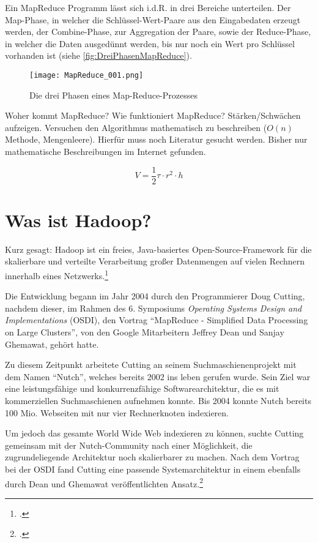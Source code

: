 Ein MapReduce Programm lässt sich i.d.R. in drei Bereiche unterteilen. Der Map-Phase, in welcher die Schlüssel-Wert-Paare aus den Eingabedaten erzeugt werden, der Combine-Phase, zur Aggregation der Paare, sowie der Reduce-Phase, in welcher die Daten ausgedünnt werden, bis nur noch ein Wert pro Schlüssel vorhanden ist (siehe \autoref{fig:DreiPhasenMapReduce}).

\begin{figure}[h]
	\centering
	\texttt{[image: MapReduce\_001.png]}
	\caption{Die drei Phasen eines Map-Reduce-Prozesses\footnotemark}
	\label{fig:DreiPhasenMapReduce}
\end{figure}

Woher kommt MapReduce? Wie funktioniert MapReduce? Stärken/Schwächen aufzeigen. Versuchen den Algorithmus mathematisch zu beschreiben ($O(n)$ Methode, Mengenleere). Hierfür muss noch Literatur gesucht werden. Bisher nur mathematische Beschreibungen im Internet gefunden.

\begin{equation}
	V = \frac{1}{2} \tau \cdot r^{2} \cdot h
\end{equation}

\section{Was ist Hadoop?}\label{sec:WasIstHadoop}
\flqq Kurz gesagt: Hadoop ist ein freies, Java-basiertes Open-Source-Framework für die skalierbare und verteilte Verarbeitung großer Datenmengen auf vielen Rechnern innerhalb eines Netzwerks.\frqq\footcite[S. 21]{Wartala.2012}

Die Entwicklung begann im Jahr 2004 durch den Programmierer Doug Cutting, nachdem dieser, im Rahmen des 6. Symposiums \textit{Operating Systems Design and Implementations} (\acs{OSDI}), den Vortrag "`MapReduce - Simplified Data Processing on Large Clusters"', von den Google Mitarbeitern Jeffrey Dean und Sanjay Ghemawat, gehört hatte.

Zu diesem Zeitpunkt arbeitete Cutting an seinem Suchmaschienenprojekt mit dem Namen "`Nutch"', welches bereits 2002 ins leben gerufen wurde. Sein Ziel war eine leistungsfähige und konkurrenzfähige Softwarearchitektur, die es mit kommerziellen Suchmaschienen aufnehmen konnte. Bis 2004 konnte Nutch bereits 100 Mio. Webseiten mit nur vier Rechnerknoten indexieren.

Um jedoch das gesamte World Wide Web indexieren zu können, suchte Cutting gemeinsam mit der Nutch-Community nach einer Möglichkeit, die zugrundeliegende Architektur noch skalierbarer zu machen. Nach dem Vortrag bei der \acs{OSDI} fand Cutting eine passende Systemarchitektur in einem ebenfalls durch Dean und Ghemawat veröffentlichten Ansatz.\footcite[Näheres siehe][]{Dean.2004}

